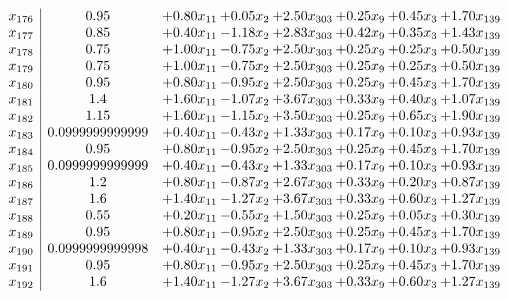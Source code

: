 \documentclass[8pt]{article}
\begin{document}
\[\begin{array}{c| c c@{\hskip 2pt} c@{\hskip 2pt} c@{\hskip 2pt} c@{\hskip 2pt} c@{\hskip 2pt} c@{\hskip 2pt} }
 x_{176}   &  0.95 & +  0.80 x_{11} & +  0.05 x_{2} & +  2.50 x_{303} & +  0.25 x_{9} & +  0.45 x_{3} & +  1.70 x_{139}\\
 x_{177}   &  0.85 & +  0.40 x_{11} & -1.18 x_{2} & +  2.83 x_{303} & +  0.42 x_{9} & +  0.35 x_{3} & +  1.43 x_{139}\\
 x_{178}   &  0.75 & +  1.00 x_{11} & -0.75 x_{2} & +  2.50 x_{303} & +  0.25 x_{9} & +  0.25 x_{3} & +  0.50 x_{139}\\
 x_{179}   &  0.75 & +  1.00 x_{11} & -0.75 x_{2} & +  2.50 x_{303} & +  0.25 x_{9} & +  0.25 x_{3} & +  0.50 x_{139}\\
 x_{180}   &  0.95 & +  0.80 x_{11} & -0.95 x_{2} & +  2.50 x_{303} & +  0.25 x_{9} & +  0.45 x_{3} & +  1.70 x_{139}\\
 x_{181}   &  1.4 & +  1.60 x_{11} & -1.07 x_{2} & +  3.67 x_{303} & +  0.33 x_{9} & +  0.40 x_{3} & +  1.07 x_{139}\\
 x_{182}   &  1.15 & +  1.60 x_{11} & -1.15 x_{2} & +  3.50 x_{303} & +  0.25 x_{9} & +  0.65 x_{3} & +  1.90 x_{139}\\
 x_{183}   &  0.0999999999999 & +  0.40 x_{11} & -0.43 x_{2} & +  1.33 x_{303} & +  0.17 x_{9} & +  0.10 x_{3} & +  0.93 x_{139}\\
 x_{184}   &  0.95 & +  0.80 x_{11} & -0.95 x_{2} & +  2.50 x_{303} & +  0.25 x_{9} & +  0.45 x_{3} & +  1.70 x_{139}\\
 x_{185}   &  0.0999999999999 & +  0.40 x_{11} & -0.43 x_{2} & +  1.33 x_{303} & +  0.17 x_{9} & +  0.10 x_{3} & +  0.93 x_{139}\\
 x_{186}   &  1.2 & +  0.80 x_{11} & -0.87 x_{2} & +  2.67 x_{303} & +  0.33 x_{9} & +  0.20 x_{3} & +  0.87 x_{139}\\
 x_{187}   &  1.6 & +  1.40 x_{11} & -1.27 x_{2} & +  3.67 x_{303} & +  0.33 x_{9} & +  0.60 x_{3} & +  1.27 x_{139}\\
 x_{188}   &  0.55 & +  0.20 x_{11} & -0.55 x_{2} & +  1.50 x_{303} & +  0.25 x_{9} & +  0.05 x_{3} & +  0.30 x_{139}\\
 x_{189}   &  0.95 & +  0.80 x_{11} & -0.95 x_{2} & +  2.50 x_{303} & +  0.25 x_{9} & +  0.45 x_{3} & +  1.70 x_{139}\\
 x_{190}   &  0.0999999999998 & +  0.40 x_{11} & -0.43 x_{2} & +  1.33 x_{303} & +  0.17 x_{9} & +  0.10 x_{3} & +  0.93 x_{139}\\
 x_{191}   &  0.95 & +  0.80 x_{11} & -0.95 x_{2} & +  2.50 x_{303} & +  0.25 x_{9} & +  0.45 x_{3} & +  1.70 x_{139}\\
 x_{192}   &  1.6 & +  1.40 x_{11} & -1.27 x_{2} & +  3.67 x_{303} & +  0.33 x_{9} & +  0.60 x_{3} & +  1.27 x_{139}\\

\end{array}\]
\end{document}
